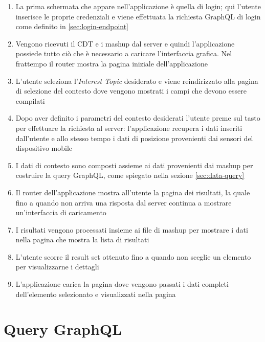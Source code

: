 \begin{enumerate}
	\item La prima schermata che appare nell'applicazione è quella di login; qui l'utente inserisce le proprie credenziali e viene effettuata la richiesta GraphQL di login come definito in \ref{sec:login-endpoint}
	\item Vengono ricevuti il CDT e i mashup dal server e quindi l'applicazione possiede tutto ciò che è necessario a caricare l'interfaccia grafica. Nel frattempo il router mostra la pagina iniziale dell'applicazione
	\item L'utente seleziona l'\emph{Interest Topic} desiderato e viene reindirizzato alla pagina di selezione del contesto dove vengono mostrati i campi che devono essere compilati
	\item Dopo aver definito i parametri del contesto desiderati l'utente preme sul tasto per effettuare la richiesta al server: l'applicazione recupera i dati inseriti dall'utente e allo stesso tempo i dati di posizione provenienti dai sensori del dispositivo mobile
	\item I dati di contesto sono composti assieme ai dati provenienti dai mashup per costruire la query GraphQL, come spiegato nella sezione \ref{sec:data-query}
	\item Il router dell'applicazione mostra all'utente la pagina dei risultati, la quale fino a quando non arriva una risposta dal server continua a mostrare un'interfaccia di caricamento
	\item I risultati vengono processati insieme ai file di mashup per mostrare i dati nella pagina che mostra la lista di risultati
	\item L'utente scorre il result set ottenuto fino a quando non sceglie un elemento per visualizzarne i dettagli
	\item L'applicazione carica la pagina dove vengono passati i dati completi dell'e\-le\-men\-to selezionato e visualizzati nella pagina
\end{enumerate}

\section{Query GraphQL}\label{sec:utilizzo-dati-app}

